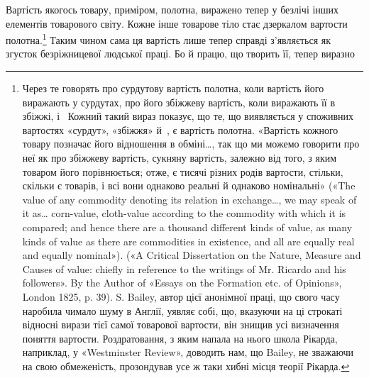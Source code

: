 Вартість якогось товару, приміром, полотна, виражено тепер
у безлічі інших елементів товарового світу. Кожне інше товарове
тіло стає дзеркалом вартости полотна.\footnote{
Через те говорять про сурдутову вартість полотна, коли вартість
його виражають у сурдутах, про його збіжжеву вартість, коли виражають
її в збіжжі, і~ Кожний такий вираз показує, що те, що виявляється
у споживних вартостях «сурдут», «збіжжя» й~, є вартість полотна.
«Вартість кожного товару позначає його відношення в обміні\dots{},
так що ми можемо говорити про неї як про збіжжеву вартість, сукняну
вартість, залежно від того, з яким товаром його порівнюється; отже, є
тисячі різних родів вартости, стільки, скільки є товарів, і всі вони однаково
реальні й однаково номінальні» («The value of any commodity denoting
its relation in exchange\dots{}, we may speak of it as\dots{} corn-value,
cloth-value according to the commodity with which it is compared; and
hence there are a thousand different kinds of value, as many kinds
of value as there are commodities in existence, and all are equally real
and equally nominal»). («A Critical Dissertation on the Nature, Measure
and Causes of value: chiefly in reference to the writings of Mr. Ricardo
and his followers». By the Author of «Essays on the Formation etc. of Opinions»,
London 1825, p. 39). S. Bailey, автор цієї анонімної праці, що
свого часу наробила чимало шуму в Англії, уявляє собі, що, вказуючи
на ці строкаті відносні вирази тієї самої товарової вартости, він знищив
усі визначення поняття вартости. Роздратовання, з яким напала на нього
школа Рікарда, наприклад, у «Westminster Review», доводить нам, що
Bailey, не зважаючи на свою обмеженість, прозондував усе ж таки
хибні місця теорії Рікарда.
} Таким чином сама ця
вартість лише тепер справді з’являється як згусток безріжницевої
людської праці. Бо й працю, що творить її, тепер виразно
\parbreak{}  %
